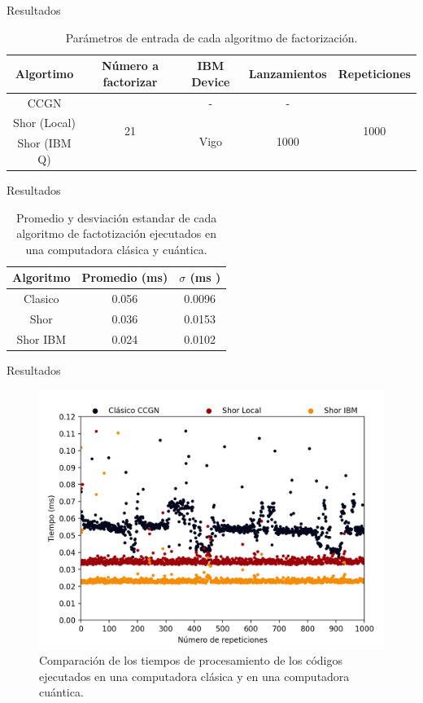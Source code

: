 \begin{frame}{Resultados}
    \begin{table}[H]
    \centering
    \begin{tabular}{|c|c|c|c|c|} \hline
        Algortimo & Número a factorizar & IBM Device & Lanzamientos & Repeticiones \\ \hline 
        CCGN & \multirow{3}{*}{21} & - & -& \multirow{3}{*}{1000}\\  \cline{1-1} \cline{3-4}
        Shor (Local) &  & \multirow{2}{*}{Vigo}& \multirow{2}{*}{1000}& \\ \cline{1-1}
        Shor (IBM Q) &  & &  &\\\hline
    \end{tabular}
    \caption{Parámetros de entrada de cada algoritmo de factorización.}
    \label{table:parametros}
\end{table}
\end{frame}
\begin{frame}{Resultados}
    \begin{table}[H]
    \centering
    \begin{tabular}{ccc} \hline
        Algoritmo & Promedio (ms) & $\sigma$ (ms ) \\ \hline
        Clasico & 0.056 & 0.0096 \\
        Shor &0.036& 0.0153 \\
        Shor IBM &0.024 &0.0102 \\ \hline
    \end{tabular}
    \caption{Promedio y desviación estandar de cada algoritmo de factotización ejecutados en una computadora clásica y cuántica.}
    \label{tabla:resultados}
\end{table}
\end{frame}
\begin{frame}{Resultados}
    \begin{figure}[H]
    \centering
    \includegraphics[scale=0.5]{images/time.png}
    \caption{Comparación de los tiempos de procesamiento de los códigos
    ejecutados en una computadora clásica y en una computadora cuántica.}
    \label{fig:time}
\end{figure}
\end{frame}